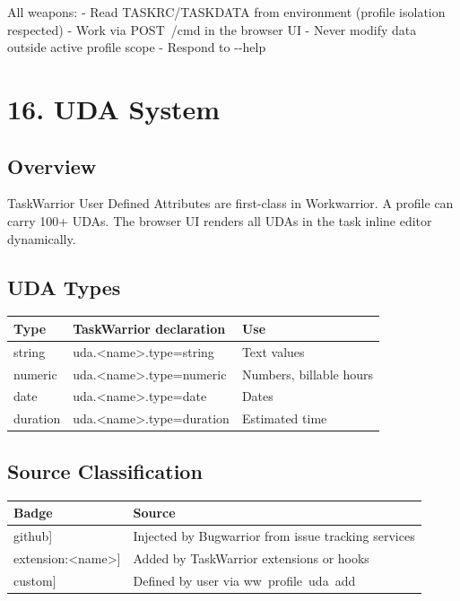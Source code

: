 \documentclass[11pt, a4paper, DIV=14]{scrartcl}
\renewcommand{\texttt}[1]{{\ttfamily\fontsize{8.5}{10.5}\selectfont\color{BabbNavy}#1}}
\let\origRule\rule
\renewcommand{\rule}[2]{\par\vspace{2pt}\noindent{\color{BabbBorder}\origRule[0pt]{#1}{#2}}\par\vspace{2pt}}
\begin{document}
All weapons: - Read TASKRC/TASKDATA from environment (profile isolation
respected) - Work via \texttt{POST\ /cmd} in the browser UI - Never
modify data outside active profile scope - Respond to \texttt{-\/-help}

\begin{center}\rule{0.5\linewidth}{0.5pt}\end{center}

\section{16. UDA System}\label{uda-system}

\subsection{Overview}\label{overview-3}

TaskWarrior User Defined Attributes are first-class in Workwarrior. A
profile can carry 100+ UDAs. The browser UI renders all UDAs in the task
inline editor dynamically.

\subsection{UDA Types}\label{uda-types}

{\def\LTcaptype{none} %
\begin{longtable}[]{@{}lll@{}}
\toprule\noalign{}
Type & TaskWarrior declaration & Use \\
\midrule\noalign{}
\endhead
\bottomrule\noalign{}
\endlastfoot
string & \texttt{uda.\textless{}name\textgreater{}.type=string} & Text
values \\
numeric & \texttt{uda.\textless{}name\textgreater{}.type=numeric} &
Numbers, billable hours \\
date & \texttt{uda.\textless{}name\textgreater{}.type=date} & Dates \\
duration & \texttt{uda.\textless{}name\textgreater{}.type=duration} &
Estimated time \\
\end{longtable}
}

\subsection{Source Classification}\label{source-classification}

{\def\LTcaptype{none} %
\begin{longtable}[]{@{}ll@{}}
\toprule\noalign{}
Badge & Source \\
\midrule\noalign{}
\endhead
\bottomrule\noalign{}
\endlastfoot
\texttt{{[}github{]}} & Injected by Bugwarrior from issue tracking
services \\
\texttt{{[}extension:\textless{}name\textgreater{}{]}} & Added by
TaskWarrior extensions or hooks \\
\texttt{{[}custom{]}} & Defined by user via
\texttt{ww\ profile\ uda\ add} \\
\end{longtable}
}
\end{document}
